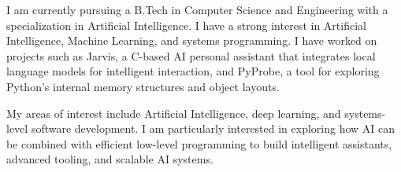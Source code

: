 \documentclass[12pt]{article}
\begin{document}
\vspace{0.3cm}

\noindent I am currently pursuing a B.Tech in Computer Science and Engineering with a specialization in Artificial Intelligence. I have a strong interest in Artificial Intelligence, Machine Learning, and systems programming. I have worked on projects such as Jarvis, a C-based AI personal assistant that integrates local language models for intelligent interaction, and PyProbe, a tool for exploring Python's internal memory structures and object layouts.

My areas of interest include Artificial Intelligence, deep learning, and systems-level software development. I am particularly interested in exploring how AI can be combined with efficient low-level programming to build intelligent assistants, advanced tooling, and scalable AI systems.
\end{document}
